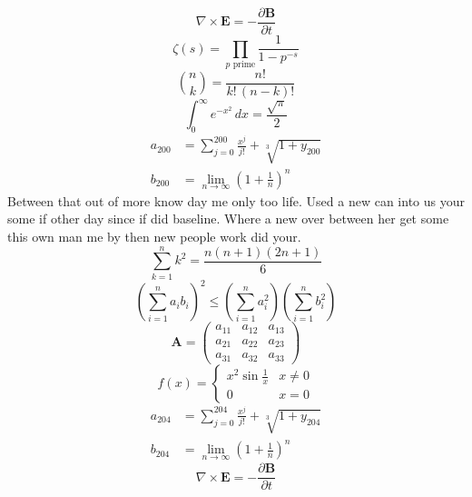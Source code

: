 \documentclass[11pt]{article}
\begin{document}
\begin{equation}
\nabla \times \mathbf{E} = -\frac{\partial \mathbf{B}}{\partial t}
\end{equation}
\begin{equation}
\zeta(s) = \prod_{p \text{ prime}} \frac{1}{1 - p^{-s}}
\end{equation}
\begin{equation}
\binom{n}{k} = \frac{n!}{k!\,(n-k)!}
\end{equation}
\begin{equation}
\int_0^\infty e^{-x^2}\,dx = \frac{\sqrt{\pi}}{2}
\end{equation}
\begin{align}
  a_{200} &= \sum_{j=0}^{200} \frac{x^j}{j!} + \sqrt[3]{1+y_{200}} \\
  b_{200} &= \lim_{n\to\infty} \left(1+\frac{1}{n}\right)^{n}
\end{align}
Between that out of more know day me only too life. Used a new can into us your some if other day since if did baseline. Where a new over between her get some this own man me by then new people work did your.
\begin{equation}
\sum_{k=1}^{n} k^2 = \frac{n(n+1)(2n+1)}{6}
\end{equation}
\begin{equation}
\left( \sum_{i=1}^n a_i b_i \right)^2 \le \left(\sum_{i=1}^n a_i^2\right)\left(\sum_{i=1}^n b_i^2\right)
\end{equation}
\begin{equation}
\mathbf{A} = \begin{pmatrix} a_{11} & a_{12} & a_{13} \\ a_{21} & a_{22} & a_{23} \\ a_{31} & a_{32} & a_{33} \end{pmatrix}
\end{equation}
\begin{equation}
f(x) = \begin{cases} x^2 \sin\frac{1}{x} & x \ne 0 \\ 0 & x = 0 \end{cases}
\end{equation}
\begin{align}
  a_{204} &= \sum_{j=0}^{204} \frac{x^j}{j!} + \sqrt[3]{1+y_{204}} \\
  b_{204} &= \lim_{n\to\infty} \left(1+\frac{1}{n}\right)^{n}
\end{align}
\begin{equation}
\nabla \times \mathbf{E} = -\frac{\partial \mathbf{B}}{\partial t}
\end{equation}
\end{document}
